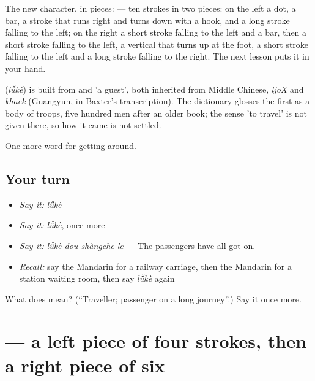 The new character, in pieces:  — ten strokes in two pieces: on the left a dot, a bar, a stroke that runs right and turns down with a hook, and a long stroke falling to the left; on the right a short stroke falling to the left and a bar, then a short stroke falling to the left, a vertical that turns up at the foot, a short stroke falling to the left and a long stroke falling to the right. The next lesson puts it in your hand.

\begin{cousinweb}
\textbf{} (\emph{lǚkè}) is built from  and  'a guest', both inherited from Middle Chinese, \emph{ljoX} and \emph{khaek} (Guangyun, in Baxter's transcription). The dictionary glosses the first as a body of troops, five hundred men after an older book; the sense 'to travel' is not given there, so how it came is not settled.
\end{cousinweb}

\begin{grammarlens}[title={What you've built}]
One more word for getting around.
\end{grammarlens}

\subsection*{Your turn}
\begin{itemize}
\raggedright
  \item \emph{Say it:} \emph{lǚkè}
  \item \emph{Say it:} \emph{lǚkè}, once more
  \item \emph{Say it:} \emph{lǚkè dōu shàngchē le} — The passengers have all got on.
  \item \emph{Recall:} say the Mandarin for a railway carriage, then the Mandarin for a station waiting room, then say \emph{lǚkè} again
\end{itemize}

\begin{tcolorbox}[breakable,colback=teal!4,colframe=teal!35!black,title={Before you move on}]
What does  mean? (\textquotedblleft{}Traveller; passenger on a long journey\textquotedblright{}.) Say it once more.
\end{tcolorbox}
\section[\texorpdfstring{\zh{旅} (lǚ)}{旅 (lǚ)}]{ — a left piece of four strokes, then a right piece of six}

